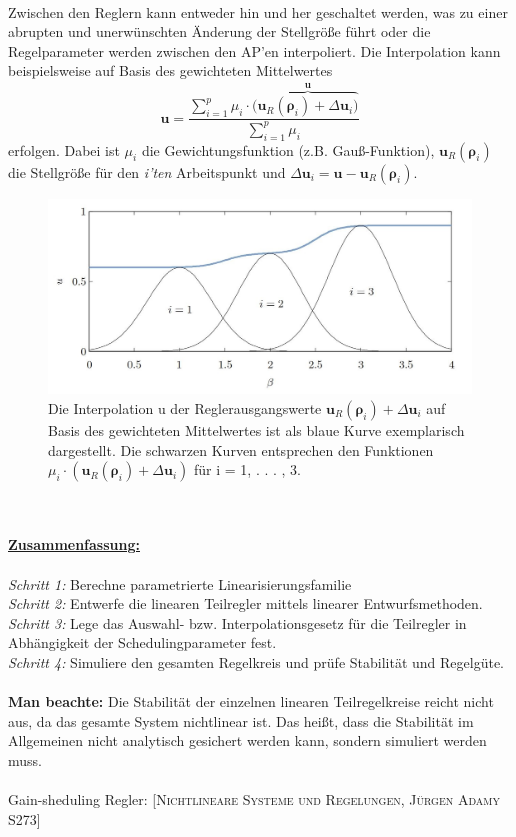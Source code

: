 		\leavevmode \\
		Zwischen den Reglern kann entweder hin und her geschaltet werden, was zu einer abrupten und unerwünschten Änderung der Stellgröße führt oder die Regelparameter werden zwischen den AP'en interpoliert. Die Interpolation kann beispielsweise auf Basis des gewichteten Mittelwertes
		\[\bm{u}=\dfrac{\sum_{i=1}^{p}\mu_{i}\cdot(\overbrace{\bm{u}_{R}(\bm{\rho}_{i})+\Delta\bm{u}_{i})}^{\bm{u}}}{\sum_{i=1}^{p}\mu_{i}}\]
		 erfolgen. Dabei ist $ \mu_{i} $ die Gewichtungsfunktion (z.B. Gauß-Funktion), $ \bm{u}_{R}(\bm{\rho}_{i}) $ die Stellgröße für den \textit{i'ten} Arbeitspunkt und $ \Delta\bm{u}_{i} = \bm{u} - \bm{u}_{R}(\bm{\rho}_{i}) $.
		 \begin{figure}[!h]
		 	\centering
		 	\includegraphics[width=0.8\linewidth]{./pics/re/int}
		 	\caption{Die Interpolation u der Reglerausgangswerte $ \bm{u}_{R}(\bm{\rho}_{i})+\Delta\bm{u}_{i} $ auf Basis des
		 		gewichteten Mittelwertes ist als blaue Kurve exemplarisch dargestellt. Die schwarzen
		 		Kurven entsprechen den Funktionen $\mu_{i}\cdot(\bm{u}_{R}(\bm{\rho}_{i})+\Delta\bm{u}_{i})  $ für i = 1, . . . , 3.}
		 \end{figure}
	 \leavevmode\\\\
	 \textbf{\underline{Zusammenfassung:}}\\\\
	 \textit{Schritt 1:} Berechne parametrierte Linearisierungsfamilie\\
	 \textit{Schritt 2:} Entwerfe die linearen Teilregler mittels linearer Entwurfsmethoden.\\
	 \textit{Schritt 3:} Lege das Auswahl- bzw. Interpolationsgesetz für die Teilregler in Abhängigkeit der Schedulingparameter fest.\\
	 \textit{Schritt 4:} Simuliere den gesamten Regelkreis und prüfe Stabilität und Regelgüte.\\\\
	 \textbf{Man beachte:} Die Stabilität der einzelnen linearen Teilregelkreise reicht nicht aus, da das gesamte System nichtlinear ist. Das heißt, dass die Stabilität im Allgemeinen nicht analytisch gesichert werden kann, sondern simuliert werden muss.\\\\
	 Gain-sheduling Regler: [\textsc{Nichtlineare Systeme und Regelungen, Jürgen Adamy S273}]
	 
